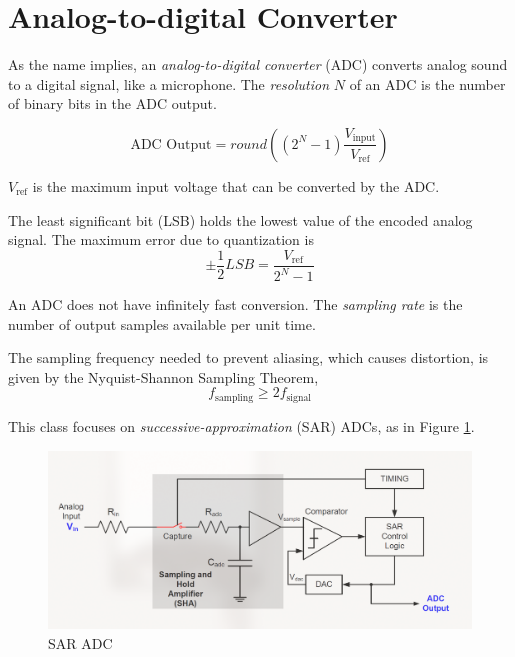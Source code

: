 \section{Analog-to-digital Converter}

As the name implies, an \emph{analog-to-digital converter}
(ADC) converts analog sound to a digital signal, like a
microphone.
The \emph{resolution} $N$ of an ADC is the number of binary bits
in the ADC output.

\begin{equation}
    \text{ADC Output} = round\left( (2^N - 1)\frac{V_{\text{input}}}{V_{\text{ref}}} \right)
\end{equation}

$V_{\text{ref}}$ is the maximum input voltage that can be converted by the ADC.

The least significant bit (LSB) holds the lowest value of the encoded
analog signal.
The maximum error due to quantization is
\begin{equation}
    \pm \frac{1}{2}LSB = \frac{V_\text{ref}}{2^N-1}
\end{equation}

An ADC does not have infinitely fast conversion. The \emph{sampling rate}
is the number of output samples available per unit time.

The sampling frequency needed to prevent aliasing, which causes distortion,
is given by the Nyquist-Shannon Sampling Theorem,
\begin{equation}
    f_{\text{sampling}} \geq 2f_{\text{signal}}
\end{equation}

This class focuses on \emph{successive-approximation} (SAR) ADCs,
as in Figure \ref{fig:saradc}.

\begin{figure}
    \includegraphics{images/saradc.png}
    \caption{SAR ADC}
    \label{fig:saradc}
\end{figure}